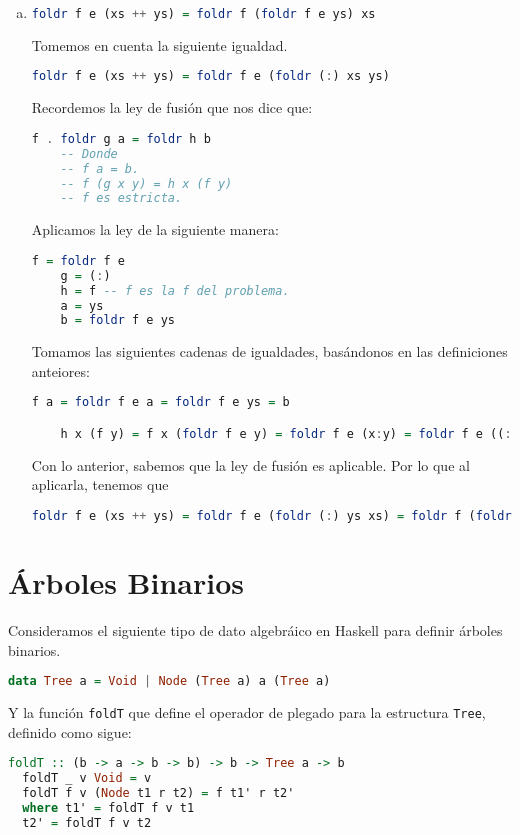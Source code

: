 \documentclass[spanish,12pt,letterpaper]{article}
\begin{document}
\begin{enumerate}[(a)]
\item
  \begin{lstlisting}[language=Haskell]
    foldr f e (xs ++ ys) = foldr f (foldr f e ys) xs
  \end{lstlisting}
  Tomemos en cuenta la siguiente igualdad.
  \begin{lstlisting}[language=Haskell]
    foldr f e (xs ++ ys) = foldr f e (foldr (:) xs ys)
  \end{lstlisting}
  Recordemos la ley de fusión que nos dice que:
  \begin{lstlisting}[language=Haskell]
    f . foldr g a = foldr h b
    -- Donde
    -- f a = b.
    -- f (g x y) = h x (f y)
    -- f es estricta.
  \end{lstlisting}
  Aplicamos la ley de la siguiente manera:
  \begin{lstlisting}[language=Haskell]
    f = foldr f e
    g = (:)
    h = f -- f es la f del problema.
    a = ys
    b = foldr f e ys
  \end{lstlisting}
  Tomamos las siguientes cadenas de igualdades, basándonos en las definiciones
  anteiores:
  \begin{lstlisting}[language=Haskell]
    f a = foldr f e a = foldr f e ys = b

    h x (f y) = f x (foldr f e y) = foldr f e (x:y) = foldr f e ((:) x y) = foldr f e (g x y) = f (g x y).
  \end{lstlisting}
  Con lo anterior, sabemos que la ley de fusión es aplicable. Por lo que al
  aplicarla, tenemos que
  \begin{lstlisting}[language=Haskell]
    foldr f e (xs ++ ys) = foldr f e (foldr (:) ys xs) = foldr f (foldr f e ys)xs
  \end{lstlisting}
\end{enumerate}

\section{Árboles Binarios}

Consideramos el siguiente tipo de dato algebráico en Haskell para definir árboles
binarios.
\begin{lstlisting}[language=Haskell]
  data Tree a = Void | Node (Tree a) a (Tree a)
\end{lstlisting}

Y la función \texttt{foldT} que define el operador de plegado para la estructura
\texttt{Tree}, definido como sigue:

\begin{lstlisting}[language=Haskell]
  foldT :: (b -> a -> b -> b) -> b -> Tree a -> b
  foldT _ v Void = v
  foldT f v (Node t1 r t2) = f t1' r t2'
  where t1' = foldT f v t1
  t2' = foldT f v t2
\end{lstlisting}
\end{document}
